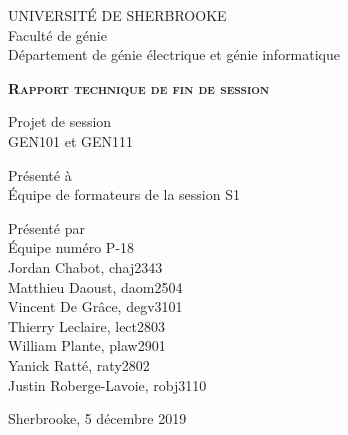 \begin{titlepage}
    \centering
    UNIVERSITÉ DE SHERBROOKE\\
    Faculté de génie\\
    Département de génie électrique et génie informatique

    \vfill

    {\LARGE \bfseries \scshape Rapport technique de fin de session}

    \vfill

    Projet de session\\
    GEN101 et GEN111

    \vfill
    
    Présenté à\\
    Équipe de formateurs de la session S1

    \vfill

    Présenté par\\
    Équipe numéro P-18\\
    Jordan Chabot, chaj2343\\
    Matthieu Daoust, daom2504\\
    Vincent De Grâce, degv3101\\
    Thierry Leclaire, lect2803\\
    William Plante, plaw2901\\
    Yanick Ratté, raty2802\\
    Justin Roberge-Lavoie, robj3110

    \vfill

    Sherbrooke, 5 décembre 2019
\end{titlepage}
